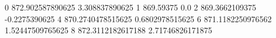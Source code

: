 0 872.902587890625 3.308837890625
1 869.59375 0.0
2 869.3662109375 -0.2275390625
4 870.2740478515625 0.6802978515625
6 871.1182250976562 1.52447509765625
8 872.3112182617188 2.71746826171875
